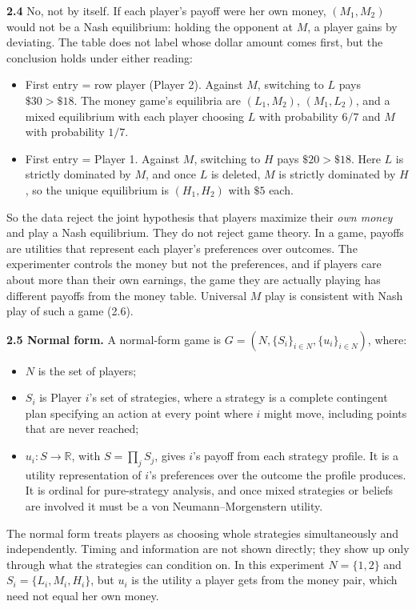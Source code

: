 \documentclass[11pt]{article}
\begin{document}
\textbf{2.4} No, not by itself. If each player's payoff were her own money, $(M_1,M_2)$ would not be a Nash equilibrium: holding the opponent at $M$, a player gains by deviating. The table does not label whose dollar amount comes first, but the conclusion holds under either reading:
\begin{itemize}
\item First entry = row player (Player 2). Against $M$, switching to $L$ pays $\$30>\$18$. The money game's equilibria are $(L_1,M_2)$, $(M_1,L_2)$, and a mixed equilibrium with each player choosing $L$ with probability $6/7$ and $M$ with probability $1/7$.
\item First entry = Player 1. Against $M$, switching to $H$ pays $\$20>\$18$. Here $L$ is strictly dominated by $M$, and once $L$ is deleted, $M$ is strictly dominated by $H$, so the unique equilibrium is $(H_1,H_2)$ with $\$5$ each.
\end{itemize}
So the data reject the joint hypothesis that players maximize their \emph{own money} and play a Nash equilibrium. They do not reject game theory. In a game, payoffs are utilities that represent each player's preferences over outcomes. The experimenter controls the money but not the preferences, and if players care about more than their own earnings, the game they are actually playing has different payoffs from the money table. Universal $M$ play is consistent with Nash play of such a game (2.6).

\textbf{2.5 Normal form.} A normal-form game is $G=(N,\{S_i\}_{i\in N},\{u_i\}_{i\in N})$, where:
\begin{itemize}
\item $N$ is the set of players;
\item $S_i$ is Player $i$'s set of strategies, where a strategy is a complete contingent plan specifying an action at every point where $i$ might move, including points that are never reached;
\item $u_i:S\to\mathbb{R}$, with $S=\prod_j S_j$, gives $i$'s payoff from each strategy profile. It is a utility representation of $i$'s preferences over the outcome the profile produces. It is ordinal for pure-strategy analysis, and once mixed strategies or beliefs are involved it must be a von Neumann--Morgenstern utility.
\end{itemize}
The normal form treats players as choosing whole strategies simultaneously and independently. Timing and information are not shown directly; they show up only through what the strategies can condition on. In this experiment $N=\{1,2\}$ and $S_i=\{L_i,M_i,H_i\}$, but $u_i$ is the utility a player gets from the money pair, which need not equal her own money.
\end{document}
